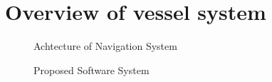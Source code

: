 \documentclass[lettersize,journal]{IEEEtran}
\begin{document}
\section{Overview of vessel system}
\begin{figure}[H]
  \begin{center}
  \end{center}
  \caption{Achtecture of Navigation System}
  \label{fig:arch_nav}
\end{figure}

\begin{figure}[H]
  \begin{center}
  \end{center}
  \caption{Proposed Software System}
  \label{fig:pss}
\end{figure}
\end{document}
